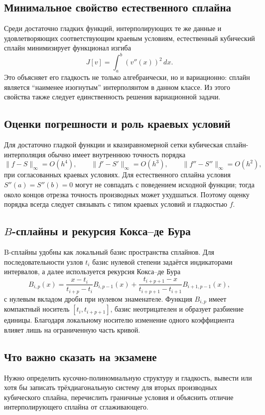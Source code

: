 \subsection{Минимальное свойство естественного сплайна}

Среди достаточно гладких функций, интерполирующих те же данные и удовлетворяющих
соответствующим краевым условиям, естественный кубический сплайн минимизирует функционал
изгиба
\[
    J[v]=\int_a^b (v''(x))^2\,dx.
\]
Это объясняет его гладкость не только алгебраически, но и вариационно: сплайн является
``наименее изогнутым'' интерполянтом в данном классе. Из этого свойства также следует
единственность решения вариационной задачи.

\subsection{Оценки погрешности и роль краевых условий}

Для достаточно гладкой функции и квазиравномерной сетки кубическая сплайн-интерполяция
обычно имеет внутреннюю точность порядка
\[
    \|f-S\|_\infty=O(h^4),
    \qquad
    \|f'-S'\|_\infty=O(h^3),
    \qquad
    \|f''-S''\|_\infty=O(h^2),
\]
при согласованных краевых условиях. Для естественного сплайна условия
$S''(a)=S''(b)=0$ могут не совпадать с поведением исходной функции; тогда около концов
отрезка точность производных может ухудшаться. Поэтому оценку порядка всегда следует
связывать с типом краевых условий и гладкостью $f$.

\subsection[B-сплайны и рекурсия Кокса--де Бура]{$B$-сплайны и рекурсия Кокса--де Бура}

B-сплайны удобны как локальный базис пространства сплайнов. Для последовательности
узлов $t_i$ базис нулевой степени задаётся индикаторами интервалов, а далее используется
рекурсия Кокса--де Бура
\[
 B_{i,p}(x)
 =\frac{x-t_i}{t_{i+p}-t_i}B_{i,p-1}(x)
 +\frac{t_{i+p+1}-x}{t_{i+p+1}-t_{i+1}}B_{i+1,p-1}(x),
\]
с нулевым вкладом дроби при нулевом знаменателе. Функция $B_{i,p}$ имеет компактный
носитель $[t_i,t_{i+p+1}]$, базис неотрицателен и образует разбиение единицы. Благодаря
локальному носителю изменение одного коэффициента влияет лишь на ограниченную часть
кривой.

\subsection{Что важно сказать на экзамене}

Нужно определить кусочно-полиномиальную структуру и гладкость, вывести или хотя
бы записать трёхдиагональную систему для вторых производных кубического сплайна,
перечислить граничные условия и объяснить отличие интерполирующего сплайна от
сглаживающего.

\newpage
